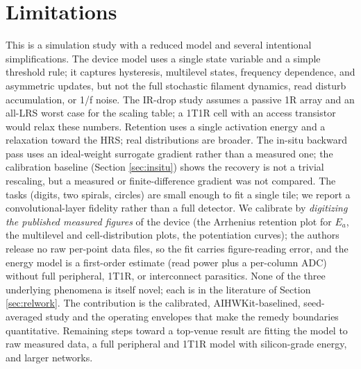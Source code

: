 \documentclass[conference]{IEEEtran}
\begin{document}
\section{Limitations}
\label{sec:limitations}
This is a simulation study with a reduced model and several intentional
simplifications. The device model uses a single state variable and a simple
threshold rule; it captures hysteresis, multilevel states, frequency dependence,
and asymmetric updates, but not the full stochastic filament dynamics, read
disturb accumulation, or 1/f noise. The IR-drop study assumes a passive 1R array
and an all-LRS worst case for the scaling table; a 1T1R cell with an access
transistor would relax these numbers. Retention uses a single activation energy
and a relaxation toward the HRS; real distributions are broader. The in-situ
backward pass uses an ideal-weight surrogate gradient rather than a measured one;
the calibration baseline (Section \ref{sec:insitu}) shows the recovery is not a
trivial rescaling, but a measured or finite-difference gradient was not compared.
The tasks (digits, two spirals, circles) are small enough to fit a single tile;
we report a convolutional-layer fidelity rather than a full detector. We
calibrate by \emph{digitizing the published measured figures} of the device (the
Arrhenius retention plot for $E_a$, the multilevel and cell-distribution plots,
the potentiation curves); the authors release no raw per-point data files, so the
fit carries figure-reading error, and the energy model is a first-order estimate
(read power plus a per-column ADC) without full peripheral, 1T1R, or interconnect
parasitics. None of the three underlying phenomena is itself novel; each is in
the literature of Section \ref{sec:relwork}. The contribution is the calibrated,
AIHWKit-baselined, seed-averaged study and the operating envelopes that make the
remedy boundaries quantitative. Remaining steps toward a top-venue result are
fitting the model to raw measured data, a full peripheral and 1T1R model with
silicon-grade energy, and larger networks.
\end{document}
